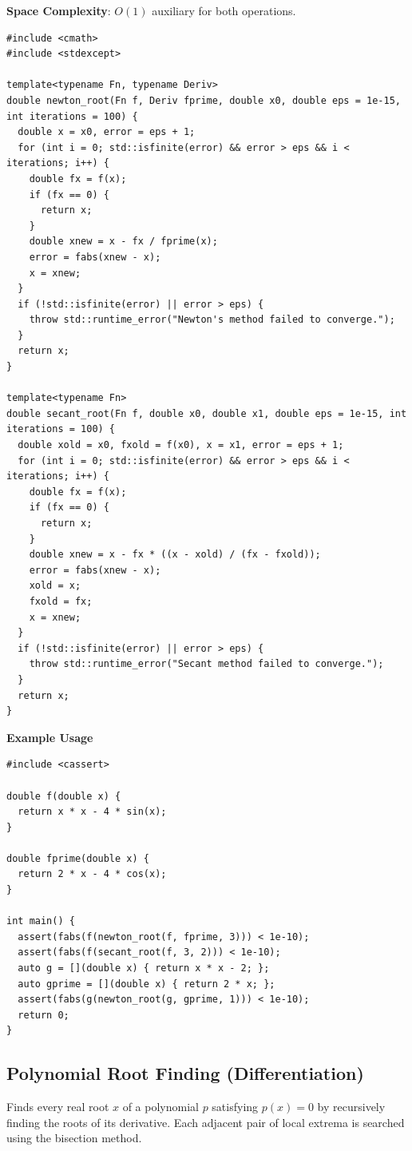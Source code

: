 \textbf{Space Complexity}: $O(1)$ auxiliary for both operations.

\begin{lstlisting}[style=cpp]
#include <cmath>
#include <stdexcept>

template<typename Fn, typename Deriv>
double newton_root(Fn f, Deriv fprime, double x0, double eps = 1e-15, int iterations = 100) {
  double x = x0, error = eps + 1;
  for (int i = 0; std::isfinite(error) && error > eps && i < iterations; i++) {
    double fx = f(x);
    if (fx == 0) {
      return x;
    }
    double xnew = x - fx / fprime(x);
    error = fabs(xnew - x);
    x = xnew;
  }
  if (!std::isfinite(error) || error > eps) {
    throw std::runtime_error("Newton's method failed to converge.");
  }
  return x;
}

template<typename Fn>
double secant_root(Fn f, double x0, double x1, double eps = 1e-15, int iterations = 100) {
  double xold = x0, fxold = f(x0), x = x1, error = eps + 1;
  for (int i = 0; std::isfinite(error) && error > eps && i < iterations; i++) {
    double fx = f(x);
    if (fx == 0) {
      return x;
    }
    double xnew = x - fx * ((x - xold) / (fx - fxold));
    error = fabs(xnew - x);
    xold = x;
    fxold = fx;
    x = xnew;
  }
  if (!std::isfinite(error) || error > eps) {
    throw std::runtime_error("Secant method failed to converge.");
  }
  return x;
}
\end{lstlisting}
\textbf{Example Usage}\par
\begin{lstlisting}[style=cpp]
#include <cassert>

double f(double x) {
  return x * x - 4 * sin(x);
}

double fprime(double x) {
  return 2 * x - 4 * cos(x);
}

int main() {
  assert(fabs(f(newton_root(f, fprime, 3))) < 1e-10);
  assert(fabs(f(secant_root(f, 3, 2))) < 1e-10);
  auto g = [](double x) { return x * x - 2; };
  auto gprime = [](double x) { return 2 * x; };
  assert(fabs(g(newton_root(g, gprime, 1))) < 1e-10);
  return 0;
}
\end{lstlisting}
\subsection{Polynomial Root Finding (Differentiation)}
\label{sec:5.4.3}
Finds every real root $x$ of a polynomial $p$ satisfying $p(x) = 0$ by recursively finding the roots of its derivative. Each adjacent pair of local extrema is searched using the bisection method.

